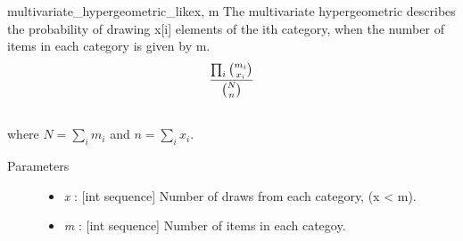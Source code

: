 \hypertarget{pymc.distributions.multivariate_hypergeometric_like}{}\begin{funcdesc}{multivariate\_hypergeometric\_like}{x, m}
The multivariate hypergeometric describes the probability of drawing x{[}i{]}
elements of the ith category, when the number of items in each category is
given by m.
\begin{gather}
\begin{split}\frac{\prod_i \binom{m_i}{x_i}}{\binom{N}{n}}\end{split}\notag\\\begin{split}\end{split}\notag
\end{gather}
where $N = \sum_i m_i$ and $n = \sum_i x_i$.
\begin{description}
\item[Parameters] \leavevmode\begin{itemize}
\item {}
\emph{x} : {[}int sequence{]} Number of draws from each category, (x \textless{} m).

\item {}
\emph{m} : {[}int sequence{]} Number of items in each categoy.

\end{itemize}

\end{description}
\end{funcdesc}

